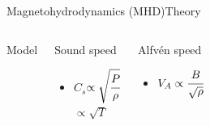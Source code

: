 \documentclass[11pt,table]{beamer}
\begin{document}
\begin{frame}{Magnetohydrodynamics (MHD)}{Theory}
\begin{columns}
\begin{block}{Model}
        \end{block}
        \begin{columns}[t]
            \begin{block}{Sound speed}
                \begin{itemize}
                    \item $C_s$\hfill$\propto \sqrt{\cfrac{P}{\rho}}$\\
                        \vspace{0.5em}\hfill$\propto\sqrt{T}$
                \end{itemize}
            \end{block}
            \begin{block}{Alfv\'en speed}
                \begin{itemize}
                    \item $V_A \propto \cfrac{B}{\sqrt{\rho}}$
                \end{itemize}
            \end{block}
        \end{columns}
    \end{columns}
\end{frame}%
\end{document}
